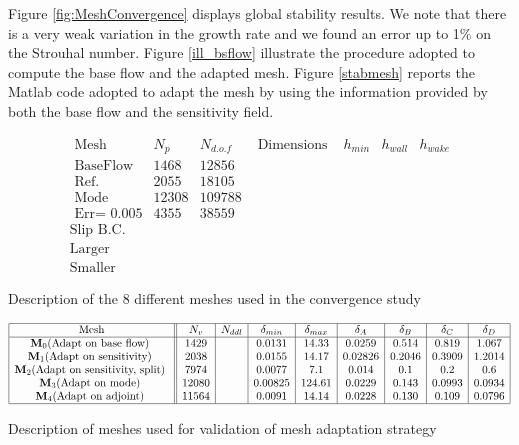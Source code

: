 \documentclass[twocolumn,10pt]{asme2ej}
\begin{document}
Figure \ref{fig:MeshConvergence} displays global stability results. We note that there is 
a very weak variation in the growth rate and we found an error up to 1\% on the 
Strouhal number. Figure \ref{ill_bsflow} illustrate the procedure adopted to compute the 
base flow and the adapted mesh. Figure \ref{stabmesh} reports the Matlab code 
adopted to adapt the mesh by using the information provided by both the base flow and the sensitivity field. 


\begin{table}
$$
\begin{array}{c|c|c|c|c|c|c|}
\mbox{ Mesh } & N_p & N_{d.o.f} & \mbox{ Dimensions } & h_{min} & h_{wall} & h_{wake} \\ 
\mbox{ BaseFlow } & 1468 & 12856 \\
\mbox{ Ref.} & 2055 & 18105\\
\mbox{ Mode} &12308 & 109788 \\
\mbox{ Err= }0.005 & 4355 & 38559 \\
\mbox{Slip B.C.} & \\ 
\mbox{Larger} & \\
\mbox{Smaller} &  
\end{array}
$$
\caption{Description of the 8 different meshes used in the convergence study}
\end{table}




\begin{table}
$$
\begin{array}{|c||c|c|c|c|c|c|c|c|c|}
\hline
\mbox{Mesh} & N_v & N_{ddl} & \delta_{min} & \delta_{max} & \delta_A  & \delta_B  & \delta_C  & \delta_D  \\
\hline
\mathbf{M}_0 \mbox{(Adapt on base flow) } & 1429 & 		& 0.0131 & 14.33 		& 0.0259 	& 0.514 	& 0.819 	& 1.067 \\   
\mathbf{M}_1 \mbox{(Adapt on sensitivity) } & 2038 & 		& 0.0155 & 14.17 		& 0.02826 & 0.2046 	& 0.3909 	& 1.2014 	\\
\mathbf{M}_2 \mbox{(Adapt on sensitivity, split) } & 7974 &		& 0.0077 & 7.1  		& 0.014 	& 0.1 	&   0.2 	& 0.6   \\
\mathbf{M}_3 \mbox{(Adapt on mode) } 	& 12080  &			&0.00825	& 124.61		& 0.0229	& 0.143	& 0.0993	& 0.0934 \\
\mathbf{M}_4 \mbox{(Adapt on adjoint) } 	& 11564 	&		& 0.0091	& 14.14		& 0.0228	& 0.130	& 0.109	& 0.0796  \\
\hline
\end{array}
$$
\caption{Description of meshes used for validation of mesh adaptation strategy}
\end{table}
\end{document}
